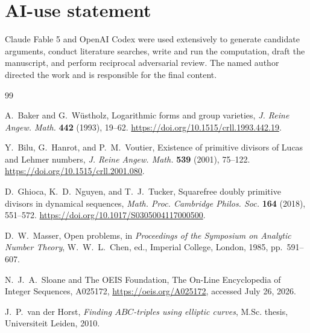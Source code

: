 \documentclass[11pt]{article}
\theoremstyle{remark}
\begin{document}
\section*{AI-use statement}

Claude Fable 5 and OpenAI Codex were used extensively to generate candidate
arguments, conduct literature searches, write and run the computation,
draft the manuscript, and perform reciprocal adversarial review.  The
named author directed the work and is responsible for the final content.

\begin{thebibliography}{99}

A.~Baker and G.~Wüstholz,
\newblock Logarithmic forms and group varieties,
\newblock \emph{J. Reine Angew. Math.} \textbf{442} (1993), 19--62.
\newblock \url{https://doi.org/10.1515/crll.1993.442.19}.

Y.~Bilu, G.~Hanrot, and P.~M.~Voutier,
\newblock Existence of primitive divisors of Lucas and Lehmer numbers,
\newblock \emph{J. Reine Angew. Math.} \textbf{539} (2001), 75--122.
\newblock \url{https://doi.org/10.1515/crll.2001.080}.

D.~Ghioca, K.~D.~Nguyen, and T.~J.~Tucker,
\newblock Squarefree doubly primitive divisors in dynamical sequences,
\newblock \emph{Math. Proc. Cambridge Philos. Soc.} \textbf{164} (2018),
551--572.
\newblock \url{https://doi.org/10.1017/S0305004117000500}.

D.~W.~Masser,
\newblock Open problems,
\newblock in \emph{Proceedings of the Symposium on Analytic Number Theory},
W.~W.~L.~Chen, ed., Imperial College, London, 1985, pp.~591--607.

N.~J.~A.~Sloane and The OEIS Foundation,
\newblock The On-Line Encyclopedia of Integer Sequences, A025172,
\newblock \url{https://oeis.org/A025172}, accessed July 26, 2026.

J.~P.~van der Horst,
\newblock \emph{Finding \(ABC\)-triples using elliptic curves},
\newblock M.Sc. thesis, Universiteit Leiden, 2010.

\end{thebibliography}
\end{document}
